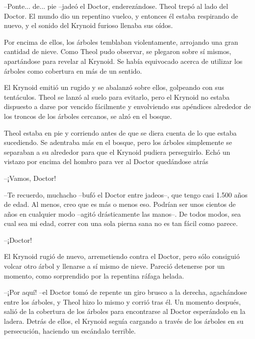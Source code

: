--Ponte... de... pie --jadeó el Doctor, enderezándose. Theol trepó al lado del Doctor. El mundo dio un repentino vuelco, y entonces él estaba respirando de nuevo, y el sonido del Krynoid furioso llenaba sus oídos.



Por encima de ellos, los árboles temblaban violentamente, arrojando una gran cantidad de nieve. Como Theol pudo observar, se plegaron sobre sí mismos, apartándose para revelar al Krynoid. Se había equivocado acerca de utilizar los árboles como cobertura en más de un sentido.



El Krynoid emitió un rugido y se abalanzó sobre ellos, golpeando con sus tentáculos. Theol se lanzó al suelo para evitarlo, pero el Krynoid no estaba dispuesto a darse por vencido fácilmente y envolviendo sus apéndices alrededor de los troncos de los árboles cercanos, se alzó en el bosque.



Theol estaba en pie y corriendo antes de que se diera cuenta de lo que estaba sucediendo. Se adentraba más en el bosque, pero los árboles simplemente se separaban a su alrededor para que el Krynoid pudiera perseguirlo. Echó un vistazo por encima del hombro para ver al Doctor quedándose atrás 

--¡Vamos, Doctor!



--Te recuerdo, muchacho --bufó el Doctor entre jadeos--, que tengo casi 1.500 años de edad. Al menos, creo que es más o menos eso. Podrían ser unos cientos de años en cualquier modo --agitó drásticamente las manos--. De todos modos, sea cual sea mi edad, correr con una sola pierna sana no es tan fácil como parece.



--¡Doctor!



El Krynoid rugió de nuevo, arremetiendo contra el Doctor, pero sólo consiguió volcar otro árbol y llenarse a sí mismo de nieve. Pareció detenerse por un momento, como sorprendido por la repentina ráfaga helada.



--¡Por aquí! --el Doctor tomó de repente un giro brusco a la derecha, agachándose entre los árboles, y Theol hizo lo mismo y corrió tras él. Un momento después, salió de la cobertura de los árboles para encontrarse al Doctor esperándolo en la ladera. Detrás de ellos, el Krynoid seguía cargando a través de los árboles en su persecución, haciendo un escándalo terrible.



